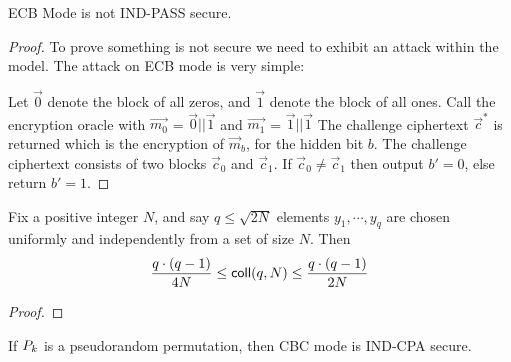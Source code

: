 \begin{theorem} \label{thm:ecb_is_not_ind_pass}
  ECB Mode is not \textsf{IND-PASS} secure.
\end{theorem}

\begin{proof}
  To prove something is not secure we need to exhibit an attack within the
  model. The attack on ECB mode is very simple:

  Let $\vec{0}$ denote the block of all zeros, and $\vec{1}$ denote the block
  of all ones. Call the encryption oracle with $\vec{m_0}$ = $\vec{0}||\vec{1}$
  and $\vec{m_1}$ = $\vec{1}||\vec{1}$ The challenge ciphertext $\vec{c}^*$ is
  returned which is the encryption of $\vec{m}_b$, for the hidden bit $b$. The
  challenge ciphertext consists of two blocks $\vec{c}_0$ and $\vec{c}_1$. If
  $\vec{c}_0 \neq \vec{c}_1$ then output $b' = 0$, else return $b' = 1$.
\end{proof}

\newline

\begin{lemma} \label{lem:collision}
  Fix a positive integer $N$, and say $q \le \sqrt{2N}$ elements
  $y_1, \cdots, y_q$ are chosen uniformly and independently from a set of size
  $N$. Then
  \begin{equation}
    \frac{q \cdot (q-1)}{4N} \le \textsf{coll}(q,N) \le \frac{q \cdot (q-1)}{2N}
  \end{equation}
\end{lemma}

\begin{proof}
\end{proof}

\newline

\begin{theorem} \label{thm:cbc_is_ind_cpa}
  If $P_{k}$ is a pseudorandom permutation, then CBC mode
  is \textsf{IND-CPA} secure.
\end{theorem}

